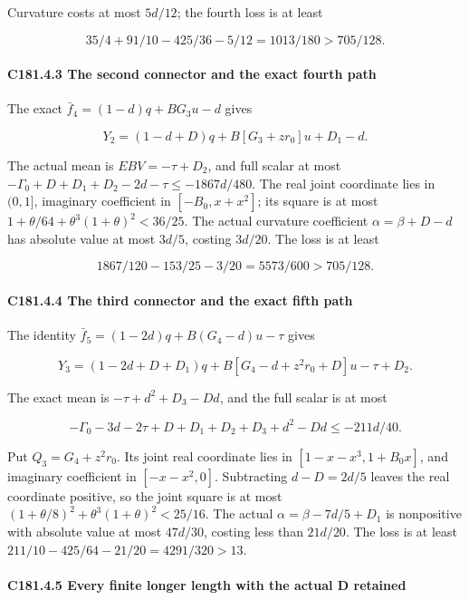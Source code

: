 Curvature costs at most \(5d/12\); the fourth loss is at least

\[
35/4+91/10-425/36-5/12=1013/180>705/128.
\tag{C181.T190.24}
\]

\paragraph{C181.4.3 The second connector and the exact fourth path}

The exact \(\bar f_4=(1-d)q+BG_3u-d\) gives

\[
Y_2=(1-d+D)q+B[G_3+zr_0]u+D_1-d.
\]

The actual mean is \(EBV=-\tau+D_2\), and full scalar at most \(-\Gamma_0+D+D_1+D_2-2d-\tau\le-1867d/480\). The real joint coordinate lies in \((0,\allowbreak \allowbreak  1]\), imaginary coefficient in \([-B_0,\allowbreak \allowbreak  x+x^2]\); its square is at most \(1+\theta/64+\theta^3(1+\theta)^2<36/25\). The actual curvature coefficient \(\alpha=\beta+D-d\) has absolute value at most \(3d/5\), costing \(3d/20\). The loss is at least

\[
1867/120-153/25-3/20=5573/600>705/128.
\tag{C181.T190.25}
\]

\paragraph{C181.4.4 The third connector and the exact fifth path}

The identity \(\bar f_5=(1-2d)q+B(G_4-d)u-\tau\) gives

\[
Y_3=(1-2d+D+D_1)q+B[G_4-d+z^2r_0+D]u-\tau+D_2.
\]

The exact mean is \(-\tau+d^2+D_3-Dd\), and the full scalar is at most

\[
-\Gamma_0-3d-2\tau+D+D_1+D_2+D_3+d^2-Dd\le-211d/40.
\]

Put \(Q_3=G_4+z^2r_0\). Its joint real coordinate lies in \([1-x-x^3,\allowbreak \allowbreak  1+B_0x]\), and imaginary coefficient in \([-x-x^2,\allowbreak \allowbreak  0]\). Subtracting \(d-D=2d/5\) leaves the real coordinate positive, so the joint square is at most \((1+\theta/8)^2+\theta^3(1+\theta)^2<25/16\). The actual \(\alpha=\beta-7d/5+D_1\) is nonpositive with absolute value at most \(47d/30\), costing less than \(21d/20\). The loss is at least \(211/10-425/64-21/20=4291/320>13\).

\paragraph{C181.4.5 Every finite longer length with the actual D retained}

